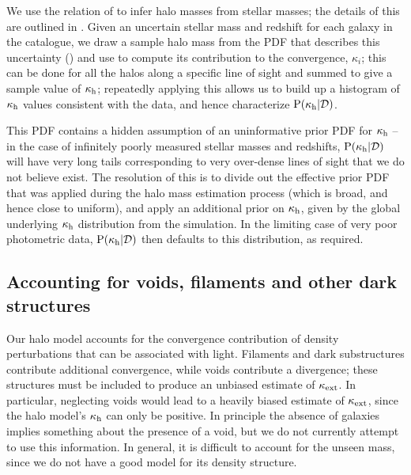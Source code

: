 \documentclass[useAMS,usenatbib,a4paper]{mn2e}
\begin{document}
We use the relation of \citet{BehrooziEtal2010} to infer halo masses
from stellar masses; the details of this \proceedure are outlined in 
. Given an uncertain stellar mass and redshift for
each galaxy in the  catalogue, we draw a sample halo mass from the PDF
that describes this uncertainty () and use
 to compute its contribution to the convergence,
$\kappa_i$; this can be done for all the halos along a specific line of sight
and summed to give a sample value of $\kappa_{\rm h}$;  repeatedly applying
this \proceedure allows us to build up a histogram of $\kappa_{\rm h}$ values
consistent with the data, and hence characterize ${\rm P}(\kappa_{\rm h}|{\mathcal{D}})$. 

This PDF contains a hidden assumption of an uninformative prior PDF for
$\kappa_{\rm h}$ -- in the case of infinitely poorly measured stellar masses and
redshifts, ${\rm P}(\kappa_{\rm h}|{\mathcal{D}})$ will have very long tails corresponding to
very over-dense lines of sight that we do not believe exist. The resolution of this
is to divide out the effective prior PDF that was applied during the halo mass
estimation process (which is broad, and hence close to uniform), and apply an
additional prior on $\kappa_{\rm h}$, given by the global underlying $\kappa_{\rm h}$
distribution from the simulation. In the limiting  case of very poor
photometric data, ${\rm P}(\kappa_{\rm h}|{\mathcal{D}})$ then defaults to this distribution, as
required.





\subsection{Accounting for voids, filaments and other dark structures}
\label{sec:model:voids}

Our halo model accounts for the convergence contribution of density
perturbations that can be associated with light. Filaments and dark
substructures contribute additional convergence, while voids contribute a
divergence; these structures must be included to produce an unbiased estimate
of $\kappa_{\rm ext}$. In particular, neglecting voids would lead to a heavily biased
estimate of $\kappa_{\rm ext}$, since the halo model's $\kappa_{\rm h}$ can only be positive.
In principle the absence of galaxies implies something about the presence of a
void, but we do not currently attempt to use this information. In general, it
is difficult to account for the unseen mass, since we do not have a good model
for its density structure.
\end{document}
